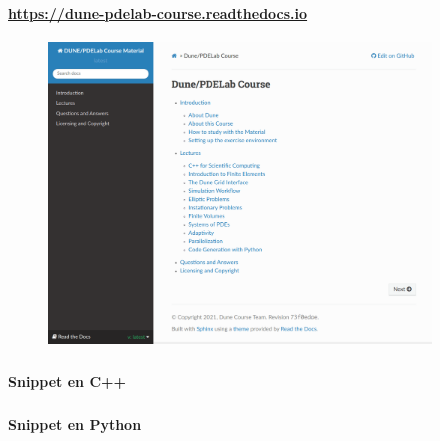 \begin{frame}[fragile]
	\frametitle{\secname}
	\framesubtitle{\url{https://dune-pdelab-course.readthedocs.io}}

	\begin{figure}[ht!]
		\centering
		\includegraphics[height=8cm]{dune_course_2021}
	\end{figure}
\end{frame}

\begin{frame}[fragile]
	\frametitle{\secname}
	\framesubtitle{Snippet en C++}
	
\end{frame}

\begin{frame}[fragile]
	\frametitle{\secname}
	\framesubtitle{Snippet en Python}
	
\end{frame}

{
\begin{frame}[plain]
\end{frame}
}

